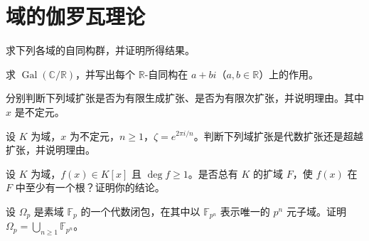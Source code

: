 \renewcommand{\thesection}{\arabic{section}}\renewcommand{\theHsection}{chapter.\arabic{section}}\setcounter{section}{2}\section{域的伽罗瓦理论}
\noindent\begin{minipage}{\textwidth}
求下列各域的自同构群，并证明所得结果。
\end{minipage}\par\vfill
\noindent\begin{minipage}{\textwidth}
求 $\operatorname{Gal}(\mathbb{C}/\mathbb{R})$，并写出每个 $\mathbb R$-自同构在 $a+bi$（$a,b\in\mathbb R$）上的作用。
\end{minipage}\par\vfill
\noindent\begin{minipage}{\textwidth}
分别判断下列域扩张是否为有限生成扩张、是否为有限次扩张，并说明理由。其中 $x$ 是不定元。
\end{minipage}\par\vfill
\newpage
\noindent\begin{minipage}{\textwidth}
设 $K$ 为域，$x$ 为不定元，$n\ge 1$，$\zeta=e^{2\pi i/n}$。判断下列域扩张是代数扩张还是超越扩张，并说明理由。
\end{minipage}\par\vfill
\noindent\begin{minipage}{\textwidth}
设 $K$ 为域，$f(x)\in K[x]$ 且 $\deg f\ge 1$。是否总有 $K$ 的扩域 $F$，使 $f(x)$ 在 $F$ 中至少有一个根？证明你的结论。
\end{minipage}\par\vfill
\noindent\begin{minipage}{\textwidth}
设 $\Omega_p$ 是素域 $\mathbb F_p$ 的一个代数闭包，在其中以 $\mathbb F_{p^n}$ 表示唯一的 $p^n$ 元子域。证明 $\Omega_p=\bigcup_{n\ge 1}\mathbb F_{p^n}$。
\end{minipage}\par\vfill
